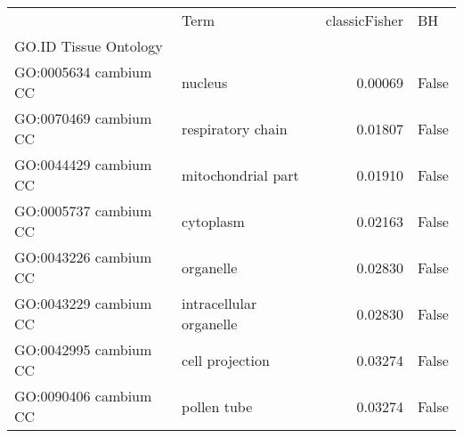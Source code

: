 \begin{tabular}{llrl}
\toprule
{} &                     Term &  classicFisher &     BH \\
GO.ID      Tissue  Ontology &                          &                &        \\
GO:0005634 cambium CC       &  nucleus &  0.00069 &  False \\
\midrule
GO:0070469 cambium CC       &  respiratory chain &  0.01807 &  False \\
GO:0044429 cambium CC       &  mitochondrial part &  0.01910 &  False \\
GO:0005737 cambium CC       &  cytoplasm &  0.02163 &  False \\
GO:0043226 cambium CC       &  organelle &  0.02830 &  False \\
GO:0043229 cambium CC       &  intracellular organelle &  0.02830 &  False \\
GO:0042995 cambium CC       &  cell projection &  0.03274 &  False \\
GO:0090406 cambium CC       &  pollen tube &  0.03274 &  False \\
\bottomrule
\end{tabular}
